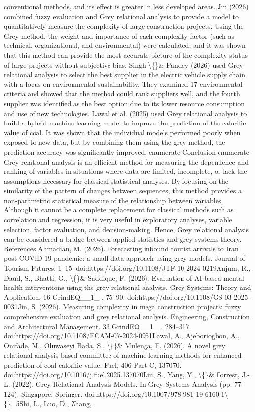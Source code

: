 \documentclass[10pt,twoside]{article}
\begin{document}
\begin{minipage}[t][\textheight]{\textwidth}
conventional methods, and its effect is greater in less developed areas. Jin (2026) combined fuzzy evaluation and Grey relational analysis to provide a model to quantitatively measure the complexity of large construction projects. Using the Grey method, the weight and importance of each complexity factor (such as technical, organizational, and environmental) were calculated, and it was shown that this method can provide the most accurate picture of the complexity status of large projects without subjective bias. Singh \textbackslash\{\}\& Pandey (2026) used Grey relational analysis to select the best supplier in the electric vehicle supply chain with a focus on environmental sustainability. They examined 17 environmental criteria and showed that the method could rank suppliers well, and the fourth supplier was identified as the best option due to its lower resource consumption and use of new technologies. Lawal et al. (2025) used Grey relational analysis to build a hybrid machine learning model to improve the prediction of the calorific value of coal. It was shown that the individual models performed poorly when exposed to new data, but by combining them using the grey method, the prediction accuracy was significantly improved. enumerate Conclusion enumerate Grey relational analysis is an efficient method for measuring the dependence and ranking of variables in situations where data are limited, incomplete, or lack the assumptions necessary for classical statistical analyses. By focusing on the similarity of the pattern of changes between sequences, this method provides a non-parametric statistical measure of the relationship between variables. Although it cannot be a complete replacement for classical methods such as correlation and regression, it is very useful in exploratory analyses, variable selection, factor evaluation, and decision-making. Hence, Grey relational analysis can be considered a bridge between applied statistics and grey systems theory. References Ahmadian, M. (2026). Forecasting inbound tourist arrivals to Iran post-COVID-19 pandemic: a small data approach using grey models. Journal of Tourism Futures, 1--15. doi:https://doi.org/10.1108/JTF-10-2024-0219Anjum, R., Daud, S., Bhatti, G., \textbackslash\{\}\& Saddique, F. (2026). Evaluation of AI-based mental health interventions using the grey relational analysis. Grey Systems: Theory and Application, 16 GrindEQ\_\_1\_ , 75--90. doi:https://doi.org/10.1108/GS-03-2025-0031Jin, S. (2026). Measuring complexity in mega construction projects: fuzzy comprehensive evaluation and grey relational analysis. Engineering, Construction and Architectural Management, 33 GrindEQ\_\_1\_ , 284--317. doi:https://doi.org/10.1108/ECAM-07-2024-0951Lawal, A., Ajeboriogbon, A., Onifade, M., Oluwaseyi Bada, S., \textbackslash\{\}\& Mulenga, F. (2026). A novel grey relational analysis-based committee of machine learning methods for enhanced prediction of coal calorific value. Fuel, 406 Part C, 137070. doi:https://doi.org/10.1016/j.fuel.2025.137070Liu, S., Yang, Y., \textbackslash\{\}\& Forrest, J.-L. (2022). Grey Relational Analysis Models. In Grey Systems Analysis (pp. 77--124). Singapore: Springer. doi:https://doi.org/10.1007/978-981-19-6160-1\textbackslash\{\}\_5Shi, L., Luo, D., Zhang, 
\end{minipage}
\end{document}
